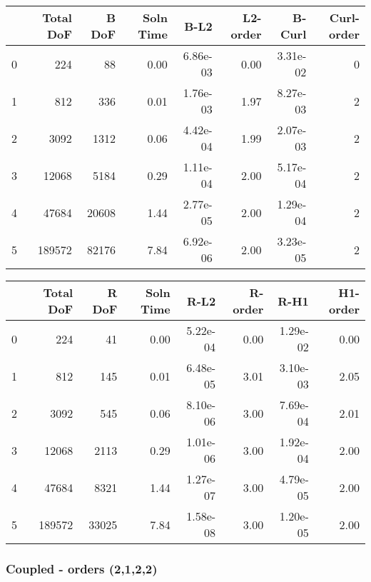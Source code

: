 \documentclass[12pt]{extarticle}
\numberwithin{equation}{section}    %
\begin{document}
    \begin{tabular}{lrrrrrrr}
\hline
{} &  Total DoF &  B DoF &  Soln Time &      B-L2 &  L2-order &    B-Curl &  Curl-order \\
\hline
0 &        224 &     88 &       0.00 &  6.86e-03 &     0.00 &  3.31e-02 &           0 \\
1 &        812 &    336 &       0.01 &  1.76e-03 &     1.97 &  8.27e-03 &           2 \\
2 &       3092 &   1312 &       0.06 &  4.42e-04 &     1.99 &  2.07e-03 &           2 \\
3 &      12068 &   5184 &       0.29 &  1.11e-04 &     2.00 &  5.17e-04 &           2 \\
4 &      47684 &  20608 &       1.44 &  2.77e-05 &     2.00 &  1.29e-04 &           2 \\
5 &     189572 &  82176 &       7.84 &  6.92e-06 &     2.00 &  3.23e-05 &           2 \\
\hline
\end{tabular}



\begin{tabular}{lrrrrrrr}
\hline
{} &  Total DoF &  R DoF &  Soln Time &      R-L2 &  R-order &      R-H1 &  H1-order \\
\hline
0 &        224 &     41 &       0.00 &  5.22e-04 &     0.00 &  1.29e-02 &      0.00 \\
1 &        812 &    145 &       0.01 &  6.48e-05 &     3.01 &  3.10e-03 &      2.05 \\
2 &       3092 &    545 &       0.06 &  8.10e-06 &     3.00 &  7.69e-04 &      2.01 \\
3 &      12068 &   2113 &       0.29 &  1.01e-06 &     3.00 &  1.92e-04 &      2.00 \\
4 &      47684 &   8321 &       1.44 &  1.27e-07 &     3.00 &  4.79e-05 &      2.00 \\
5 &     189572 &  33025 &       7.84 &  1.58e-08 &     3.00 &  1.20e-05 &      2.00 \\
\hline
\end{tabular}

\subsubsection*{Coupled - orders (2,1,2,2)}
\end{document}
